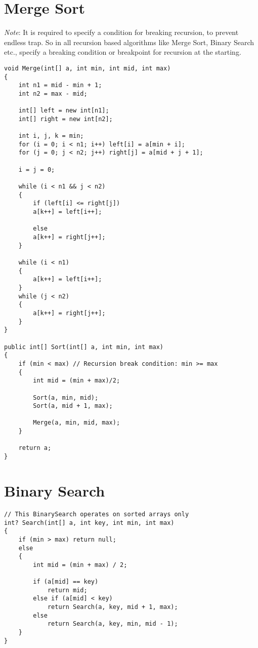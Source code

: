 \documentclass[a4paper,12pt]{article}
\begin{document}
	\section{Merge Sort}
	\emph{Note}: It is required to specify a condition for breaking recursion, to prevent endless trap. So in all recursion based algorithms like Merge Sort, Binary Search etc., specify a breaking condition or breakpoint for recursion at the starting.
	\begin{verbatim}
void Merge(int[] a, int min, int mid, int max)
{
	int n1 = mid - min + 1;
	int n2 = max - mid;
	
	int[] left = new int[n1];
	int[] right = new int[n2];
	
	int i, j, k = min;
	for (i = 0; i < n1; i++) left[i] = a[min + i];
	for (j = 0; j < n2; j++) right[j] = a[mid + j + 1];
	
	i = j = 0;
	
	while (i < n1 && j < n2)
	{
		if (left[i] <= right[j]) 
		a[k++] = left[i++];
		
		else
		a[k++] = right[j++];
	}
	
	while (i < n1)
	{
		a[k++] = left[i++];
	}
	while (j < n2)
	{
		a[k++] = right[j++];
	}
}

public int[] Sort(int[] a, int min, int max)
{
	if (min < max) // Recursion break condition: min >= max
	{
		int mid = (min + max)/2;
		
		Sort(a, min, mid);
		Sort(a, mid + 1, max);
		
		Merge(a, min, mid, max);
	}
	
	return a;
}
	\end{verbatim}
	
	\section{Binary Search}
	\begin{verbatim}
// This BinarySearch operates on sorted arrays only
int? Search(int[] a, int key, int min, int max)
{
	if (min > max) return null;
	else
	{
		int mid = (min + max) / 2;
		
		if (a[mid] == key)
			return mid;
		else if (a[mid] < key)
			return Search(a, key, mid + 1, max);
		else
			return Search(a, key, min, mid - 1);
	}
}
	\end{verbatim}
	
\end{document}
